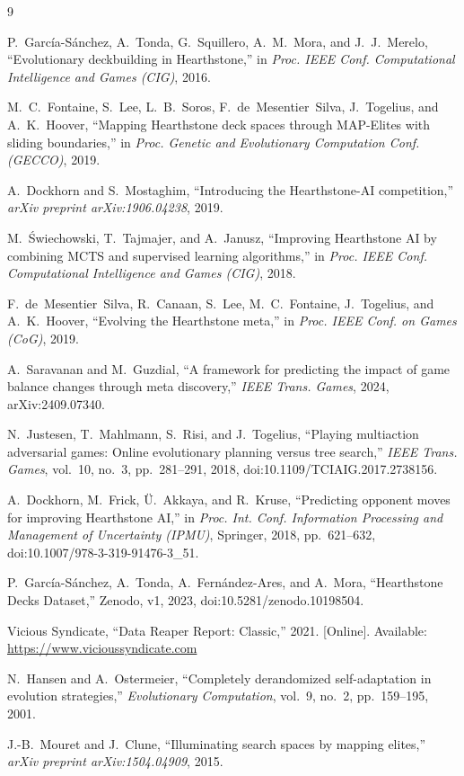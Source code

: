 \documentclass[conference]{IEEEtran}
\begin{document}
\begin{thebibliography}{9}

P.~Garc\'ia-S\'anchez, A.~Tonda, G.~Squillero, A.~M.~Mora, and
J.~J.~Merelo, ``Evolutionary deckbuilding in Hearthstone,'' in
\emph{Proc. IEEE Conf. Computational Intelligence and Games (CIG)},
2016.

M.~C.~Fontaine, S.~Lee, L.~B.~Soros, F.~de~Mesentier~Silva,
J.~Togelius, and A.~K.~Hoover, ``Mapping Hearthstone deck spaces
through MAP-Elites with sliding boundaries,'' in \emph{Proc. Genetic
and Evolutionary Computation Conf. (GECCO)}, 2019.

A.~Dockhorn and S.~Mostaghim, ``Introducing the Hearthstone-AI
competition,'' \emph{arXiv preprint arXiv:1906.04238}, 2019.

M.~\'Swiechowski, T.~Tajmajer, and A.~Janusz, ``Improving Hearthstone
AI by combining MCTS and supervised learning algorithms,'' in
\emph{Proc. IEEE Conf. Computational Intelligence and Games (CIG)},
2018.

F.~de~Mesentier~Silva, R.~Canaan, S.~Lee, M.~C.~Fontaine,
J.~Togelius, and A.~K.~Hoover, ``Evolving the Hearthstone meta,'' in
\emph{Proc. IEEE Conf. on Games (CoG)}, 2019.

A.~Saravanan and M.~Guzdial, ``A framework for predicting the impact
of game balance changes through meta discovery,'' \emph{IEEE Trans.
Games}, 2024, arXiv:2409.07340.

N.~Justesen, T.~Mahlmann, S.~Risi, and J.~Togelius, ``Playing
multiaction adversarial games: Online evolutionary planning versus
tree search,'' \emph{IEEE Trans. Games}, vol.~10, no.~3, pp.~281--291,
2018, doi:10.1109/TCIAIG.2017.2738156.

A.~Dockhorn, M.~Frick, \"U.~Akkaya, and R.~Kruse, ``Predicting
opponent moves for improving Hearthstone AI,'' in \emph{Proc. Int.
Conf. Information Processing and Management of Uncertainty (IPMU)},
Springer, 2018, pp.~621--632, doi:10.1007/978-3-319-91476-3\_51.

P.~Garc\'ia-S\'anchez, A.~Tonda, A.~Fern\'andez-Ares, and A.~Mora,
``Hearthstone Decks Dataset,'' Zenodo, v1, 2023,
doi:10.5281/zenodo.10198504.

Vicious Syndicate, ``Data Reaper Report: Classic,'' 2021. [Online].
Available: \url{https://www.vicioussyndicate.com}

N.~Hansen and A.~Ostermeier, ``Completely derandomized
self-adaptation in evolution strategies,'' \emph{Evolutionary
Computation}, vol.~9, no.~2, pp.~159--195, 2001.

J.-B.~Mouret and J.~Clune, ``Illuminating search spaces by mapping
elites,'' \emph{arXiv preprint arXiv:1504.04909}, 2015.

\end{thebibliography}
\end{document}
